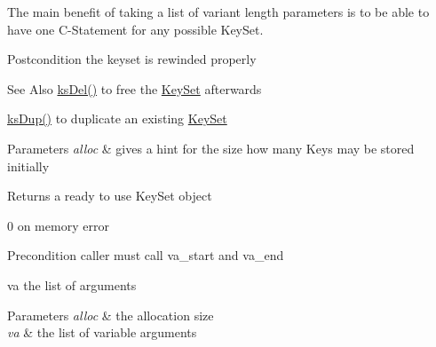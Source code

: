 The main benefit of taking a list of variant length parameters is to be able to have one C-\/\-Statement for any possible Key\-Set.

\begin{DoxyPostcond}{Postcondition}
the keyset is rewinded properly
\end{DoxyPostcond}
\begin{DoxySeeAlso}{See Also}
\hyperlink{group__keyset_ga27e5c16473b02a422238c8d970db7ac8}{ks\-Del()} to free the \hyperlink{group__keyset}{Key\-Set} afterwards 

\hyperlink{group__keyset_gac59e4b328245463f1451f68d5106151c}{ks\-Dup()} to duplicate an existing \hyperlink{group__keyset}{Key\-Set} 
\end{DoxySeeAlso}

\begin{DoxyParams}{Parameters}
{\em alloc} & gives a hint for the size how many Keys may be stored initially \\
\hline
\end{DoxyParams}
\begin{DoxyReturn}{Returns}
a ready to use Key\-Set object 

0 on memory error 
\end{DoxyReturn}


\begin{DoxyPrecond}{Precondition}
caller must call va\-\_\-start and va\-\_\-end 
\end{DoxyPrecond}
\begin{DoxyParagraph}{va the list of arguments}

\end{DoxyParagraph}

\begin{DoxyParams}{Parameters}
{\em alloc} & the allocation size \\
\hline
{\em va} & the list of variable arguments \\
\hline
\end{DoxyParams}

